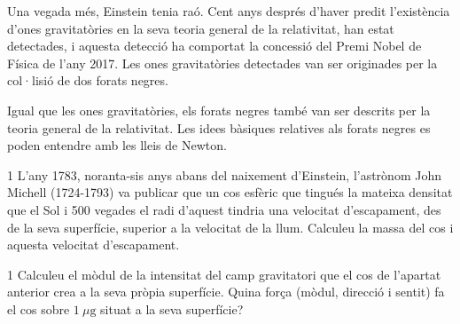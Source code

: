 Una vegada més, Einstein tenia raó. Cent anys després d'haver predit l'existència d'ones gravitatòries en la seva teoria general de la relativitat, han estat detectades, i aquesta detecció ha comportat la concessió del Premi Nobel de Física de l'any 2017. Les ones gravitatòries detectades van ser originades per la col·lisió de dos forats negres.


Igual que les ones gravitatòries, els forats negres també van ser descrits per la teoria general de la relativitat. Les idees bàsiques relatives als forats negres es poden entendre amb les lleis de Newton.

\begin{apartat}{1}
L'any 1783, noranta-sis anys abans del naixement d'Einstein, l'astrònom John Michell (1724-1793) va publicar que un cos esfèric que tingués la mateixa densitat que el Sol i 500 vegades el radi d'aquest tindria una velocitat d'escapament, des de la seva superfície, superior a la velocitat de la llum. Calculeu la massa del cos i aquesta velocitat d'escapament.
\end{apartat}

\begin{apartat}{1}
Calculeu el mòdul de la intensitat del camp gravitatori que el cos de l'apartat anterior crea a la seva pròpia superfície. Quina força (mòdul, direcció i sentit) fa el cos sobre $1\ \mu\mathrm{g}$ situat a la seva superfície?
\end{apartat}

